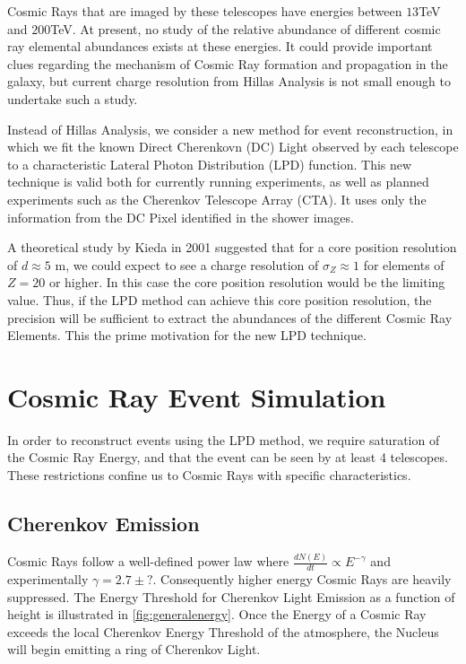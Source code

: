 \documentclass{article}
\begin{document}
Cosmic Rays that are imaged by these telescopes have energies between $13 $TeV and $200 $TeV. At present, no study of the relative abundance of different cosmic ray elemental abundances exists at these energies. It could provide important clues regarding the mechanism of Cosmic Ray formation and propagation in the galaxy, but current charge resolution from Hillas Analysis is not small enough to undertake such a study.

Instead of Hillas Analysis, we consider a new method for event reconstruction, in which we fit the known Direct Cherenkovn (DC) Light observed by each telescope to a characteristic Lateral Photon Distribution (LPD) function. This new technique is valid both for currently running experiments, as well as planned experiments such as the Cherenkov Telescope Array (CTA). It uses only the information from the DC Pixel identified in the shower images.

A theoretical study by Kieda in 2001 \cite{kieda01} suggested that for a core position resolution of $d \approx 5 $ m, we could expect to see a charge resolution of $ \sigma_{Z} \approx 1 $ for elements of $Z = 20$ or higher. In this case the core position resolution would be the limiting value. Thus, if the LPD method can achieve this core position resolution, the precision will be sufficient to extract the abundances of the different Cosmic Ray Elements. This the prime motivation for the new LPD technique.

\section{Cosmic Ray Event Simulation}
In order to reconstruct events using the LPD method, we require saturation of the Cosmic Ray Energy, and that the event can be seen by at least 4 telescopes. These restrictions confine us to Cosmic Rays with specific characteristics.

\subsection{Cherenkov Emission}
Cosmic Rays follow a well-defined power law where $ \frac{dN(E)}{dt} \propto E^{-\gamma} $ and experimentally $ \gamma = 2.7 \pm ? $. Consequently higher energy Cosmic Rays are heavily suppressed. The Energy Threshold for Cherenkov Light Emission as a function of height is illustrated in \ref{fig:generalenergy}. Once the Energy of a Cosmic Ray exceeds the local Cherenkov Energy Threshold of the atmosphere, the Nucleus will begin emitting a ring of Cherenkov Light. 
\end{document}
